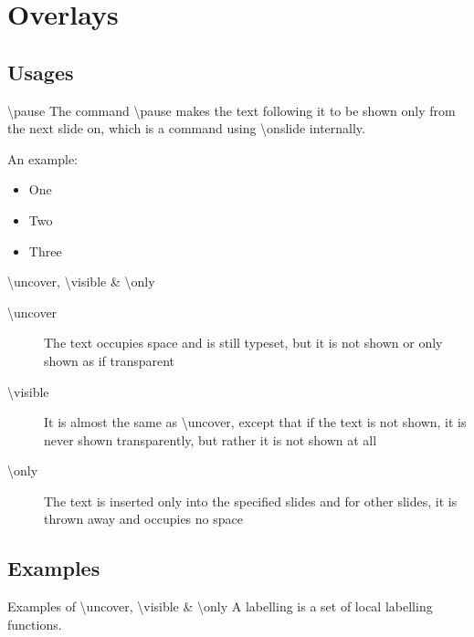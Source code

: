 
\section{Overlays}

\subsection{Usages}

\begin{frame}{\textbackslash pause}
	The command \textbackslash pause makes the text following it to be shown only from the next slide on, which is a command using \textbackslash onslide internally.

	An example:
	\begin{itemize}
		\pause
		\item One
		\pause
		\item Two
		\pause
		\item Three
	\end{itemize}
\end{frame}

\begin{frame}{\textbackslash uncover, \textbackslash visible \& \textbackslash only}
	\begin{description}
		\item[\textbackslash uncover] The text occupies space and is still typeset, but it is not shown or only shown as if transparent
		\item[\textbackslash visible] It is almost the same as \textbackslash uncover, except that if the text is not shown, it is never shown transparently, but rather it is not shown at all
		\item[\textbackslash only] The text is inserted only into the specified slides and for other slides, it is thrown away and occupies no space
	\end{description}
\end{frame}

\subsection{Examples}

\begin{frame}{Examples of \textbackslash uncover, \textbackslash visible \& \textbackslash only}
	A labelling is a set of local labelling functions.

	\begin{itemize}
	\end{itemize}

	\begin{figure}[ht]
		\centering
		
	\end{figure}
\end{frame}

